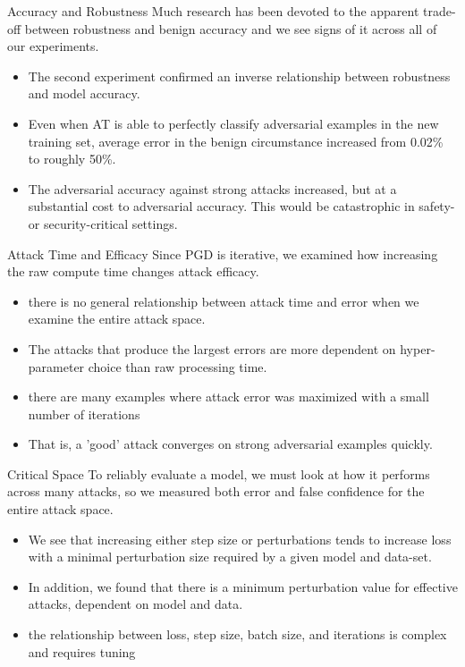 \documentclass{beamer}
\begin{document}
\begin{frame}{Accuracy and Robustness}
  Much research has been devoted to the apparent trade-off between robustness and benign accuracy and we see signs of it across all of our experiments. 
  \begin{itemize}
      \item The second experiment confirmed an inverse relationship between robustness and model accuracy.
      \item Even when AT is able to perfectly classify adversarial examples in the new training set, average error in the benign circumstance increased from 0.02\% to roughly 50\%.
      \item The adversarial accuracy against strong attacks increased, but at a substantial cost to adversarial accuracy. This would be catastrophic in safety- or security-critical settings.
  \end{itemize}  
\end{frame}

\begin{frame}{Attack Time and Efficacy}
  Since PGD is iterative, we examined how increasing the raw compute time changes attack efficacy. 
  \begin{itemize}
      \item there is no general relationship between attack time and error when we examine the entire attack space.
      \item The attacks that produce the largest errors are more dependent on hyper-parameter choice than raw processing time. 
      \item  there are many examples where attack error was maximized with a small number of iterations
      \item That is, a 'good' attack converges on strong adversarial examples quickly.
  \end{itemize}
\end{frame}

\begin{frame}{Critical Space}
  To reliably evaluate a model, we must look at how it performs across many attacks, so we measured both error and false confidence for the entire attack space. 
  \begin{itemize}
      \item We see that increasing either step size or perturbations tends to increase loss with a minimal perturbation size required by a given model and data-set.
      \item  In addition, we found that there is a minimum perturbation value for effective attacks, dependent on model and data.
      \item the relationship between loss, step size, batch size, and iterations is complex and requires tuning
  \end{itemize}
  
\end{frame}
\end{document}
